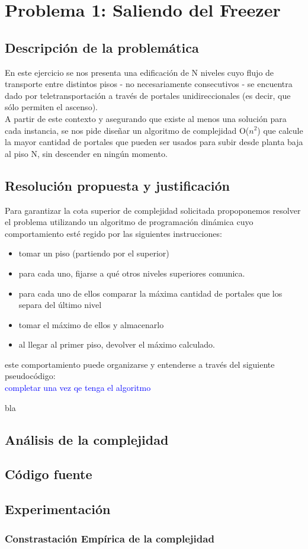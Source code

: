 \section{Problema 1: Saliendo del Freezer}

\subsection{Descripción de la problemática}
En este ejercicio se nos presenta una edificación de N niveles cuyo flujo de transporte entre distintos pisos - no necesariamente consecutivos - se encuentra dado por teletransportación a través de portales unidireccionales (es decir, que sólo permiten el ascenso).\\
A partir de este contexto y asegurando que existe al menos una solución para cada instancia, se nos pide dise\~nar un algoritmo de complejidad O($n^{2}$) que calcule la mayor cantidad de portales que pueden ser usados para subir desde planta baja al piso N, sin descender en ningún momento.\\

\subsection{Resolución propuesta y justificación}
Para garantizar la cota superior de complejidad solicitada propoponemos resolver el problema utilizando un algoritmo de programación dinámica cuyo comportamiento esté regido por las siguientes instrucciones: \\

\begin{itemize}
\item tomar un piso (partiendo por el superior)
\item para cada uno, fijarse a qué otros niveles superiores comunica.
\item para cada uno de ellos comparar la máxima cantidad de portales que los separa del último nivel
\item tomar el máximo de ellos y almacenarlo 
\item al llegar al primer piso, devolver el máximo calculado.
\end{itemize}

este comportamiento puede organizarse y entenderse a través del siguiente pseudocódigo:\\
\textcolor{blue}{completar una vez qe tenga el algoritmo}
\begin{algorithmic} 
	\STATE bla
\end{algorithmic} 


\subsection{Análisis de la complejidad}

\subsection{Código fuente}

\subsection{Experimentación}

\subsubsection{Constrastación Empírica de la complejidad}